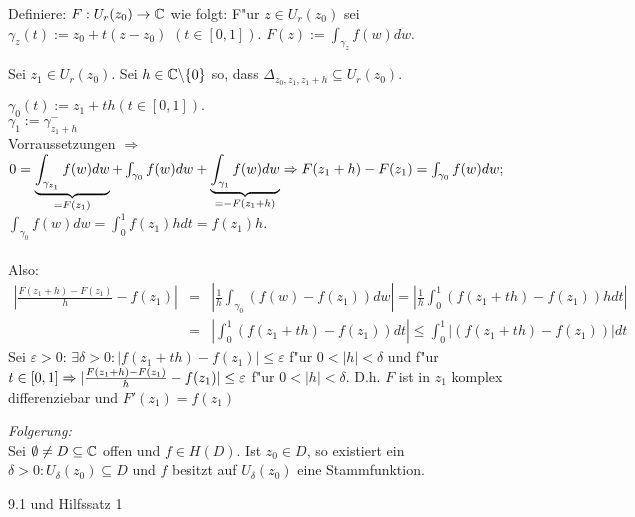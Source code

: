\documentclass[a4paper,twoside,DIV15,BCOR12mm]{scrbook}
\begin{document}
\begin{beweis}
Definiere: $F: U_r(z_0) \rightarrow \mathbb{C}$ wie folgt:
F"ur $z \in U_r(z_0)$ sei $\gamma_z(t) := z_0 + t(z-z_0) $ $(t \in [0,1]). $ $ F(z) := \int_{\gamma_z} f(w)dw$.

Sei $z_1 \in U_r(z_0)$. Sei $h \in \mathbb{C} \backslash\{0\}$ so, dass $\Delta_{z_0,z_1,z_1+h} \subseteq U_r(z_0)$.

$\gamma_0(t) := z_1 + th (t \in [0,1]).$\\
$\gamma_1 := \gamma_{z_1+h}^-$\\
Vorraussetzungen   $\Rightarrow$ $ 0 = \underbrace{\int_{\gamma_{z_1}}f(w)dw}_{=F(z_1)} +
\int_{\gamma_0} f(w)dw + \underbrace{\int_{\gamma_1}f(w)dw}_{=-F(z_1+h)} \Rightarrow F(z_1+h) - F(z_1) \\ 
= \int_{\gamma_0} f(w)dw;$\\
$\int_{\gamma_0}f(w)dw = \int_0^1 f(z_1)hdt = f(z_1)h.$\\ \\
Also:
\begin{eqnarray}\nonumber
\left| \frac{F(z_1+h) - F(z_1)}h - f(z_1) \right|&=&\left| \frac1h \int_{\gamma_0}
(f(w)-f(z_1))dw \right| = \left| \frac1h \int_0^1(f(z_1+th)-f(z_1))h dt \right|\\\nonumber 
&=& \left| \int_0^1(f(z_1+th) - f(z_1))dt \right| \leq \int_0^1 \left|(f(z_1+th) - f(z_1))\right| dt
\end{eqnarray}
Sei $\varepsilon > 0: \,\exists \delta > 0: |f(z_1+th) - f(z_1)| \leq \varepsilon$ f"ur $0 < |h| < \delta$ und f"ur $t \in [0,1] \Rightarrow \\ | \frac{F(z_1+h) - F(z_1)}h - f(z_1)| \leq \varepsilon$ f"ur $0 < |h| < \delta$. D.h. $F$ ist in $z_1$ komplex differenziebar und $F'(z_1) = f(z_1)$
\end{beweis}



\emph{Folgerung:}\\
Sei $\emptyset \not= D \subseteq \mathbb{C}$ offen und $f \in H(D)$. Ist $z_0 \in D$, so existiert ein $\delta > 0: U_{\delta}(z_0) \subseteq D$ und $f$ besitzt auf $U_{\delta}(z_0)$ eine Stammfunktion.\\

\begin{beweis}
9.1 und Hilfssatz 1
\end{beweis}


\end{document}
